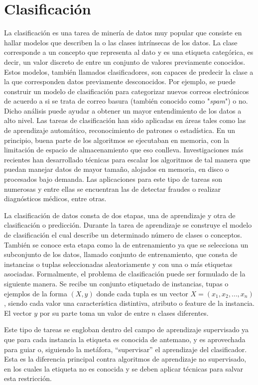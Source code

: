 \section{Clasificación}

La clasificación es una tarea de minería de datos muy popular que consiste en
hallar modelos que describen la o las clases intrínsecas de los datos. La clase
corresponde a un concepto que representa al dato y es una etiqueta categórica,
es decir, un valor discreto de entre un conjunto de valores previamente
conocidos. Estos modelos, también llamados clasificadores, son capaces de
predecir la clase a la que corresponden datos previamente desconocidos. Por
ejemplo, se puede construir un modelo de clasificación para categorizar nuevos
correos electrónicos  de acuerdo a si se trata de correo basura (también
conocido como "\textit{spam}") o no. Dicho análisis puede ayudar a obtener un
mayor entendimiento de los datos a alto nivel. Las tareas de clasificación han
sido aplicadas en áreas tales como las de aprendizaje automático, reconocimiento
de patrones o estadística. En un principio, buena parte de los algoritmos se
ejecutaban en memoria, con la limitación de espacio de almacenamiento que eso
conlleva. Investigaciones más recientes han desarrollado técnicas para escalar
los algoritmos de tal manera que puedan manejar datos de mayor tamaño, alojados
en memoria, en disco o procesados bajo demanda. Las aplicaciones para este tipo
de tareas son numerosas y entre ellas se encuentran las de detectar fraudes o
realizar diagnósticos médicos, entre otras.

La clasificación de datos consta de dos etapas, una de aprendizaje y otra de
clasificación o predicción. Durante la tarea de aprendizaje se construye el
modelo de clasificación  el cual describe un determinado número de clases o
conceptos. También se conoce esta etapa como la de entrenamiento ya que se
selecciona un subconjunto de los datos, llamado conjunto de entrenamiento, que
consta de instancias o tuplas seleccionadas aleatoriamente y con una o más
etiquetas asociadas. Formalmente, el problema de clasificación puede ser
formulado de la siguiente manera. Se recibe un conjunto etiquetado de
instancias, tupas o ejemplos de la forma $( X, y )$ donde cada tupla es un
vector $X=(x_{1},x_{2},...,x_{n})$, siendo cada valor una característica
distintiva, atributo o feature de la instancia. El vector $y$ por su parte toma
un valor de entre $n$ clases diferentes.

Este tipo de tareas se engloban dentro del campo de aprendizaje supervisado ya
que para cada instancia la etiqueta es conocida de antemano, y es aprovechada
para guiar o, siguiendo la metáfora, “supervisar” el aprendizaje del
clasificador. Esta es la diferencia principal contra algoritmos de aprendizaje
no supervisado, en los cuales la etiqueta no es conocida y se deben aplicar
técnicas para salvar esta restricción.

